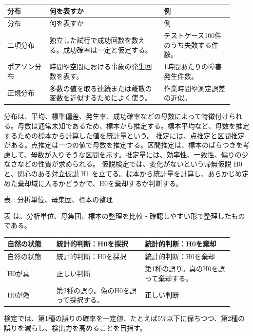\begin{longtable}{>{\raggedright\arraybackslash}p{0.17\linewidth}>{\raggedright\arraybackslash}p{0.46\linewidth}>{\raggedright\arraybackslash}p{0.29\linewidth}}
\toprule
分布 & 何を表すか & 例 \\
\midrule
\endfirsthead
\toprule
分布 & 何を表すか & 例 \\
\midrule
\endhead
二項分布 & 独立した試行で成功回数を数える。成功確率は一定と仮定する。 & テストケース100件のうち失敗する件数。 \\
ポアソン分布 & 時間や空間における事象の発生回数を表す。 & 1時間あたりの障害発生件数。 \\
正規分布 & 多数の値を取る連続または離散の変数を近似するためによく使う。 & 作業時間や測定誤差の近似。 \\
\bottomrule
\end{longtable}
分布は、平均、標準偏差、発生率、成功確率などの母数によって特徴付けられる。母数は通常未知であるため、標本から推定する。標本平均など、母数を推定するための標本から計算した値を統計量という。
推定には、点推定と区間推定がある。点推定は一つの値で母数を推定する。区間推定は、標本のばらつきを考慮して、母数が入りそうな区間を示す。推定量には、効率性、一致性、偏りの少なさなどの性質が求められる。
仮説検定では、変化がないという帰無仮説 H0 と、関心のある対立仮説 H1 を立てる。標本から統計量を計算し、あらかじめ定めた棄却域に入るかどうかで、H0を棄却するか判断する。
\par\smallskip\noindent{}\label{tab:ch18-07}表 \thetable: 分析単位、母集団、標本の整理\par\smallskip
表 \thetable は、分析単位、母集団、標本の整理を比較・確認しやすい形で整理したものである。\par\smallskip
\begin{longtable}{>{\raggedright\arraybackslash}p{0.20\linewidth}>{\raggedright\arraybackslash}p{0.36\linewidth}>{\raggedright\arraybackslash}p{0.36\linewidth}}
\toprule
自然の状態 & 統計的判断：H0を採択 & 統計的判断：H0を棄却 \\
\midrule
\endfirsthead
\toprule
自然の状態 & 統計的判断：H0を採択 & 統計的判断：H0を棄却 \\
\midrule
\endhead
H0が真 & 正しい判断 & 第1種の誤り。真のH0を誤って棄却する。 \\
H0が偽 & 第2種の誤り。偽のH0を誤って採択する。 & 正しい判断 \\
\bottomrule
\end{longtable}
検定では、第1種の誤りの確率を一定値、たとえば5\%以下に保ちつつ、第2種の誤りを減らし、検出力を高めることを目指す。
